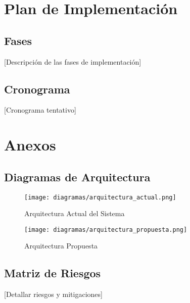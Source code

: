 \documentclass[12pt,a4paper]{article}
\begin{document}
\section{Plan de Implementación}
\subsection{Fases}
[Descripción de las fases de implementación]

\subsection{Cronograma}
[Cronograma tentativo]

\section{Anexos}
\subsection{Diagramas de Arquitectura}
\begin{figure}[H]
    \centering
    \texttt{[image: diagramas/arquitectura\_actual.png]}
    \caption{Arquitectura Actual del Sistema}
    \label{fig:arq-actual}
\end{figure}

\begin{figure}[H]
    \centering
    \texttt{[image: diagramas/arquitectura\_propuesta.png]}
    \caption{Arquitectura Propuesta}
    \label{fig:arq-propuesta}
\end{figure}

\subsection{Matriz de Riesgos}
[Detallar riesgos y mitigaciones]
\end{document}
